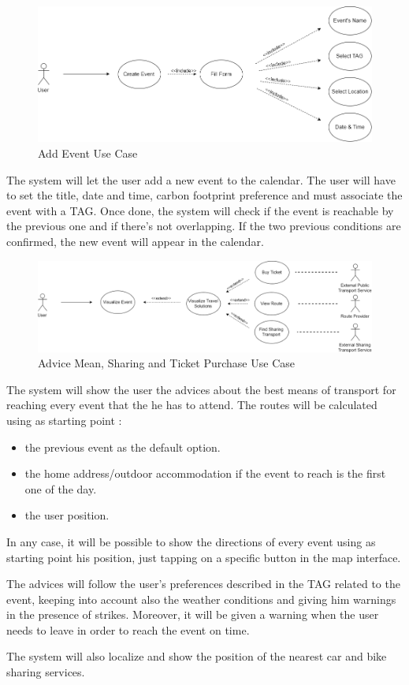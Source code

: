 \begin{figure}[H]
	\centering
	\includegraphics[scale=0.25]{Images/Use_Case/Add_Event}
	\caption{Add Event Use Case}
\end{figure}
The system will let the user add a new event to the calendar.  The user will have to set the title, date and time, carbon footprint preference and must associate the event with a TAG. 
Once done, the system will check if the event is reachable by the previous one and if there’s not overlapping. 
If the two previous conditions are confirmed, the new event will appear in the calendar.

\begin{figure}[H]
	\centering
	\includegraphics[scale=0.25]{Images/Use_Case/Advice_Mean}
	\caption{Advice Mean, Sharing and Ticket Purchase Use Case}
\end{figure}
The system will show the user the advices about the best means of transport for reaching every event that the he has to attend. The routes will be calculated using as starting point :
\begin{itemize}
	\setlength{\leftskip}{1cm}
	\item the previous event as the default option.
	\item the home address/outdoor accommodation if the event to reach is the first one of the day.
	\item the user position.
\end{itemize}\par
In any case, it will be possible to show the directions of every event using as starting point his position, just tapping on a specific button in the map interface.\par
The advices will follow the user’s preferences described in the TAG related to the event, keeping into account also the weather conditions and giving him warnings in the presence of strikes. Moreover, it will be given a warning when the user needs to leave in order to reach the event on time.\par
The system will also localize and show the position of the nearest car and bike sharing services.

